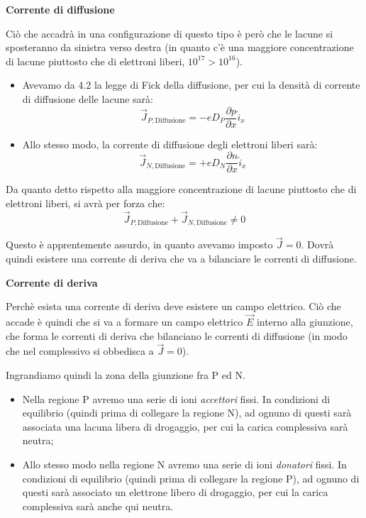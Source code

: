 \documentclass[a4paper,11pt]{article}
\begin{document}
\noindent
\textbf{\textsf{Corrente di diffusione}}

\noindent
Ciò che accadrà in una configurazione di questo tipo è però che le lacune si sposteranno da sinistra verso destra (in quanto c'è una maggiore concentrazione di lacune piuttosto che di elettroni liberi, $10^{17} > 10^{16}$).
\begin{itemize}
	\item Avevamo da 4.2 la legge di Fick della diffusione, per cui la densità di corrente di diffusione delle lacune sarà:
$$
\vec{J}_{P, \text{Diffusione}} = - e D_P \frac{\partial p}{\partial x} \hat{i}_x 
$$
	\item Allo stesso modo, la corrente di diffusione degli elettroni liberi sarà:
$$
\vec{J}_{N, \text{Diffusione}} = + e D_N \frac{\partial n}{\partial x} \hat{i}_x 
$$
\end{itemize}

Da quanto detto rispetto alla maggiore concentrazione di lacune piuttosto che di elettroni liberi, si avrà per forza che:
$$
\vec{J}_{P, \text{Diffusione}} + \vec{J}_{N, \text{Diffusione}} \neq 0
$$

Questo è apprentemente assurdo, in quanto avevamo imposto $\vec{J} = 0$. Dovrà quindi esistere una corrente di deriva che va a bilanciare le correnti di diffusione.

\par\smallskip

\noindent
\textbf{\textsf{Corrente di deriva}}

\noindent
Perchè esista una corrente di deriva deve esistere un campo elettrico. Ciò che accade è quindi che si va a formare un campo elettrico $\vec{E}$ interno alla giunzione, che forma le correnti di deriva che bilanciano le correnti di diffusione (in modo che nel complessivo si obbedisca a $\vec{J} = 0$).

Ingrandiamo quindi la zona della giunzione fra P ed N.
\begin{itemize}
	\item Nella regione P avremo una serie di ioni \textit{accettori} fissi. In condizioni di equilibrio (quindi prima di collegare la regione N), ad ognuno di questi sarà associata una lacuna libera di drogaggio, per cui la carica complessiva sarà neutra;
	\item Allo stesso modo nella regione N avremo una serie di ioni \textit{donatori} fissi. In condizioni di equilibrio (quindi prima di collegare la regione P), ad ognuno di questi sarà associato un elettrone libero di drogaggio, per cui la carica complessiva sarà anche qui neutra.
\end{itemize}
\end{document}
